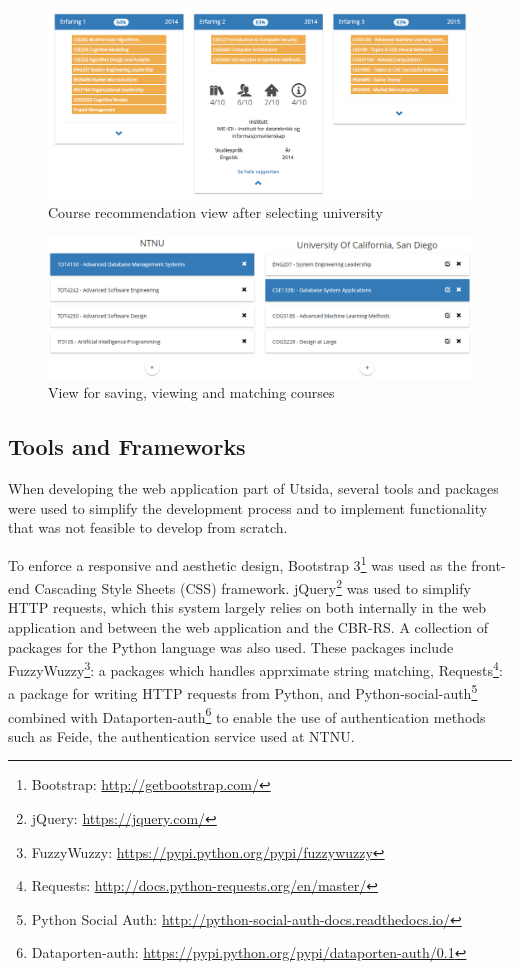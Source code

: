 \begin{figure}[h]
    \centering
    \includegraphics[width=1\textwidth]{fig/utsida_screenshots/result_2_cut_high.png}
    \caption[Course recommendation view]{Course recommendation view after selecting university}
    \label{fig:web_results_2}
\end{figure}

\begin{figure}[H]
    \centering
    \includegraphics[width=1\textwidth]{fig/utsida_screenshots/course_match_cut.png}
    \caption{View for saving, viewing and matching courses}
    \label{fig:web_courses}
\end{figure}

\subsection{Tools and Frameworks}

When developing the web application part of Utsida, several tools and packages were used to simplify the development process and to implement functionality that was not feasible to develop from scratch.

To enforce a responsive and aesthetic design, Bootstrap 3\footnote{Bootstrap: \url{http://getbootstrap.com/}} was used as the front-end Cascading Style Sheets (CSS) framework. jQuery\footnote{jQuery: \url{https://jquery.com/}} was used to simplify HTTP requests, which this system largely relies on both internally in the web application and between the web application and the CBR-RS. A collection of packages for the Python language was also used. These packages include FuzzyWuzzy\footnote{FuzzyWuzzy: \url{https://pypi.python.org/pypi/fuzzywuzzy}}: a packages which handles apprximate string matching, Requests\footnote{Requests: \url{http://docs.python-requests.org/en/master/}}: a package for writing HTTP requests from Python, and Python-social-auth\footnote{Python Social Auth: \url{http://python-social-auth-docs.readthedocs.io/}} combined with Dataporten-auth\footnote{Dataporten-auth: \url{https://pypi.python.org/pypi/dataporten-auth/0.1}} to enable the use of authentication methods such as Feide, the authentication service used at NTNU.

